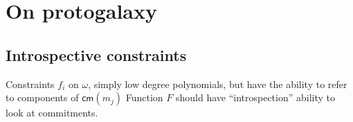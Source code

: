 \documentclass[11pt]{article} %
\newcommand{\cm}{\ensuremath{\mathsf{cm}}\xspace}
\newcommand{\wit}{\ensuremath{\omega}\xspace}
\begin{document}
% 
% 
% 
% 
% 
% 
% 
% 
% 
% 
% 
% 
% 
% 
% 


\section{On protogalaxy}
\subsection{Introspective constraints}
Constraints $f_i$ on \wit, simply low degree polynomials, but have the ability to refer to
components of $\cm(m_j)$
Function $F$ should have ``introspection'' ability to look at commitments.
\end{document}
